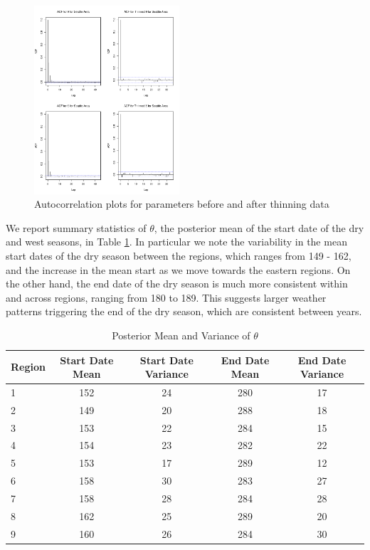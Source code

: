 \documentclass{article}
\begin{document}
\begin{figure}[H]
\includegraphics[width = .6\textwidth, height = 7cm]{acfplots}
\caption{Autocorrelation plots for parameters before and after thinning data}
\label{acfPlot}
\end{figure}

We report summary statistics of $\theta$, the posterior mean of the start date of the dry and west seasons, in Table \ref{tab:meanparams}.  In particular we note the variability in the mean start dates of the dry season between the regions, which ranges from 149 - 162, and the increase in the mean start as we move towards the eastern regions. On the other hand, the end date of the dry season is much more consistent within and across regions, ranging from 180 to 189. This suggests larger weather patterns triggering the end of the dry season, which are consistent between years. %

\begin{table}[h!]
\begin{tabular}{|l|c|c|c|c|}
\hline
Region & Start Date Mean & Start Date Variance & End Date Mean & End Date Variance\\
\hline
\hline
1&152&24&280&17\\
2&149&20&288&18\\
3&153&22&284&15\\
4&154&23&282&22\\
5&153&17&289&12\\
6&158&30&283&27\\
7&158&28&284&28\\
8&162&25&289&20\\
9&160&26&284&30\\
\hline
\end{tabular}
\caption{Posterior Mean and Variance of $\theta$}
\label{tab:meanparams}
\end{table}
\end{document}
